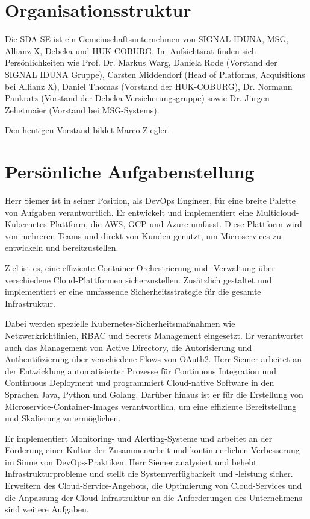 \section{Organisationsstruktur}
\label{sec:intro:organisationsstruktur}
Die SDA SE ist ein Gemeinschaftsunternehmen von SIGNAL IDUNA, MSG, Allianz X, Debeka und HUK-COBURG.
Im Aufsichtsrat finden sich Persönlichkeiten wie Prof. Dr. Markus Warg, Daniela Rode (Vorstand der SIGNAL IDUNA Gruppe), Carsten Middendorf (Head of Platforms, Acquisitions bei Allianz X), Daniel Thomas (Vorstand der HUK-COBURG), Dr. Normann Pankratz (Vorstand der Debeka Versicherungsgruppe) sowie Dr. Jürgen Zehetmaier (Vorstand bei MSG-Systems).
\medskip

Den heutigen Vorstand bildet Marco Ziegler.

\section{Persönliche Aufgabenstellung}
\label{sec:intro:persoenliche-aufgabenstellung}
Herr Siemer ist in seiner Position, als \ac{DevOps} Engineer, für eine breite Palette von Aufgaben verantwortlich.
Er entwickelt und implementiert eine Multicloud-Kubernetes-Plattform, die \ac{AWS}, \ac{GCP} und \ac{Azure} umfasst.
Diese Plattform wird von mehreren Teams und direkt von Kunden genutzt, um Microservices zu entwickeln und bereitzustellen.
\medskip

Ziel ist es, eine effiziente Container-Orchestrierung und -Verwaltung über verschiedene Cloud-Plattformen sicherzustellen.
Zusätzlich gestaltet und implementiert er eine umfassende Sicherheitsstrategie für die gesamte Infrastruktur.
\medskip

Dabei werden spezielle Kubernetes-Sicherheitsmaßnahmen wie Netzwerkrichtlinien, \ac{RBAC} und Secrets Management eingesetzt.
Er verantwortet auch das Management von Active Directory, die Autorisierung und Authentifizierung über verschiedene Flows von OAuth2.
Herr Siemer arbeitet an der Entwicklung automatisierter Prozesse für Continuous Integration und Continuous Deployment und programmiert Cloud-native Software in den Sprachen Java, Python und Golang.
Darüber hinaus ist er für die Erstellung von Microservice-Container-Images verantwortlich, um eine effiziente Bereitstellung und Skalierung zu ermöglichen.
\medskip

Er implementiert Monitoring- und Alerting-Systeme und arbeitet an der Förderung einer Kultur der Zusammenarbeit und kontinuierlichen Verbesserung im Sinne von DevOps-Praktiken.
Herr Siemer analysiert und behebt Infrastrukturprobleme und stellt die Systemverfügbarkeit und -leistung sicher.
Erweitern des Cloud-Service-Angebots, die Optimierung von Cloud-Services und die Anpassung der Cloud-Infrastruktur an die Anforderungen des Unternehmens sind weitere Aufgaben.
